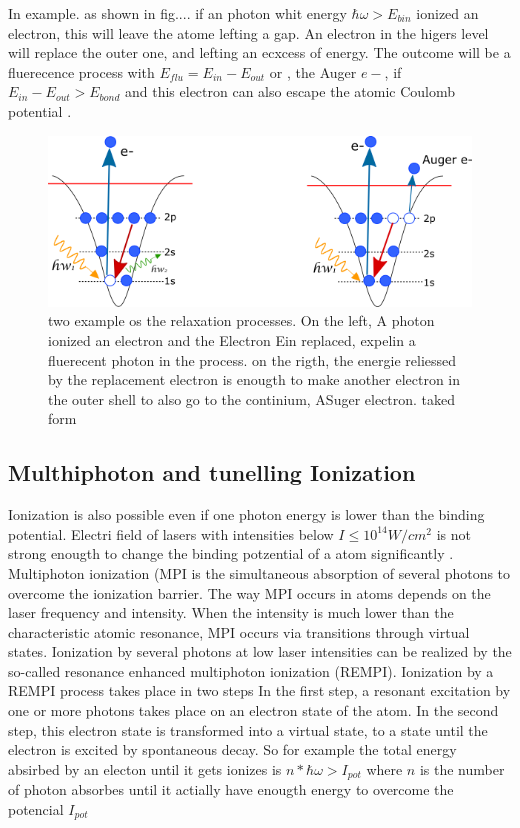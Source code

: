 In example. as shown in fig.... if an photon  whit energy $\hbar\omega > E_{bin}$  ionized an electron, this will leave the atome lefting a gap. An electron in the higers level will replace the outer one, and lefting an ecxcess of energy. The outcome will be a fluerecence process with $E_{flu} = E_{in}- E_{out}$ or , the Auger $e-$, if $ E_{in}-E_{out} > E_{bond}$ and this electron can also escape the atomic Coulomb potential \cite{schmidt_electron_1997}.

\begin{figure}[hbtp] \label{fig:augerfluorec}
\centering
\includegraphics[width=6 cm]{../Images/text6418.png}
\caption[Relaxation processes for photoionization]{two example os the relaxation processes. On the left, A photon ionized an electron and the Electron Ein replaced, expelin a fluerecent photon in the process. on the rigth, the energie reliessed by the replacement electron is enougth to make another electron in the outer shell to also go to the continium, ASuger electron. taked form \cite{rafipoor_two-color_2017}}
\end{figure}

\subsection{Multhiphoton and tunelling Ionization}

Ionization is also possible even if one photon energy is lower than the binding potential. Electri field of lasers with intensities below $I \leqslant 10^{14}W/cm^{2}$ is not strong enougth to change the binding potzential of a atom significantly \cite{rhodes_multiphoton_1985}.  Multiphoton ionization (MPI is the simultaneous absorption of several photons to overcome the ionization barrier. The way MPI occurs in atoms depends on the laser frequency and intensity. When the intensity is much lower than the characteristic atomic resonance, MPI occurs via transitions through virtual states. Ionization by several photons at low laser intensities can be realized by the so-called resonance enhanced multiphoton ionization (REMPI)\cite{mainfray_multiphoton_nodate}.  Ionization by a REMPI process takes place in two steps
In the first step, a resonant excitation by one or more photons takes place on an electron state of the atom. In the second step, this electron state is transformed into a virtual state, to a state until the electron is excited by spontaneous decay. So for example the total energy absirbed by an electon until it gets ionizes is $n * \hbar\omega > I_{pot}$ where $n$ is the number of photon absorbes until it actially have enougth energy to overcome the potencial $I_{pot}$

